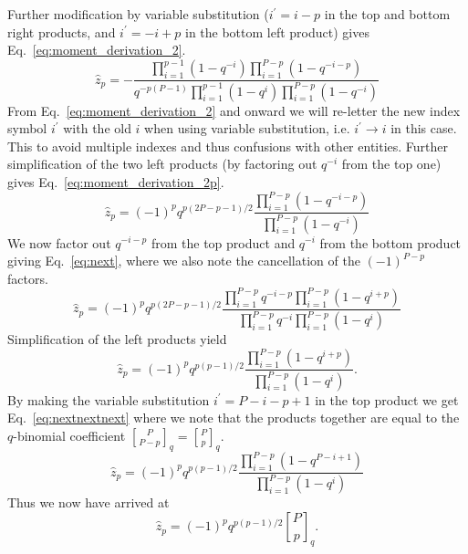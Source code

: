 \documentclass[
journal=jctcce,
manuscript=letter]{achemso}
\begin{document}
Further modification by variable substitution ($i^{\prime}=i-p$ in the top and bottom right products, and $i^{\prime}=-i+p$ in the bottom left product) gives Eq.~\ref{eq:moment_derivation_2}.
\begin{equation}
\label{eq:moment_derivation_2}
\hat{z}_p  = -\frac{   \prod_{i = 1}^{p-1} (1 - q^{-i})\prod_{i = 1}^{P-p} (1 - q^{-i-p})   }{q^{-p(P-1)}\prod_{i = 1 }^{p-1} (1 - q^{i})\prod_{i = 1}^{P-p} (1 - q^{-i})  }
\end{equation}
From Eq.~\ref{eq:moment_derivation_2} and onward we will re-letter the new index symbol $i^{\prime}$ with the old $i$ when using variable substitution, i.e. $i^{\prime}\to i$ in this case. This to avoid multiple indexes and thus confusions with other entities. Further simplification of the two left products (by factoring out $q^{-i}$ from the top one) gives Eq.~\ref{eq:moment_derivation_2p}.
\begin{equation}
\label{eq:moment_derivation_2p}
\hat{z}_p =  (-1)^pq^{p(2P-p-1)/2} \frac{   \prod_{i = 1}^{P-p} (1 - q^{-i-p})   }{\prod_{i = 1}^{P-p} (1 - q^{-i})  }
\end{equation}
We now factor out $q^{-i-p}$ from the top product and $q^{-i}$ from the bottom product giving Eq.~\ref{eq:next}, where we also note the cancellation of the $(-1)^{P-p}$ factors.
\begin{equation}
\label{eq:next}
\hat{z}_p =  (-1)^pq^{p(2P-p-1)/2} \frac{\prod_{i = 1}^{P-p}q^{-i-p}  \prod_{i = 1}^{P-p} (1 - q^{i+p})   }{\prod_{i = 1}^{P-p}q^{-i}\prod_{i = 1}^{P-p} (1 - q^{i})  }
\end{equation}
Simplification of the left products yield
\begin{equation}
\label{eq:nextnext}
\hat{z}_p = (-1)^pq^{p(p-1)/2} \frac{\prod_{i = 1}^{P-p} (1 - q^{i+p})   }{\prod_{i = 1}^{P-p} (1 - q^{i})  }.
\end{equation}
By making the variable substitution $i^{\prime} = P-i-p+1$ in the top product we get Eq.~\ref{eq:nextnextnext} where we note that the products together are equal to the $q$-binomial coefficient\cite{comtetadvanced} ${P \brack P-p}_q = {P \brack p}_q$.
\begin{equation}
\label{eq:nextnextnext}
\hat{z}_p = (-1)^pq^{p(p-1)/2} \frac{\prod_{i = 1}^{P-p} (1 - q^{P-i+1})   }{\prod_{i = 1}^{P-p} (1 - q^{i})  }
\end{equation}
Thus we now have arrived at
\begin{equation}
\label{eq:moment_derivation_4}
\hat{z}_p  = (-1)^pq^{p(p-1)/2}{P \brack p}_q.
\end{equation}
\end{document}
